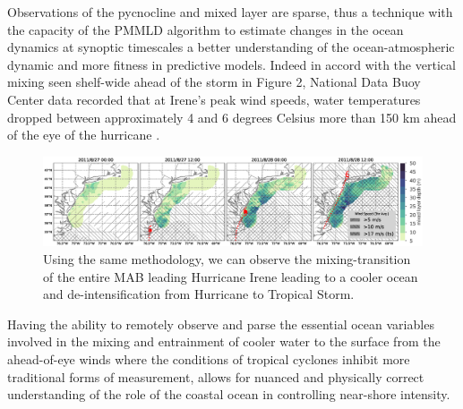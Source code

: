 \documentclass{article}
\begin{document}
Observations of the pycnocline and mixed layer are sparse, thus a technique with the capacity of the PMMLD algorithm to estimate changes in the ocean dynamics at synoptic timescales a better understanding of the ocean-atmospheric dynamic and more fitness in predictive models.
Indeed in accord with the vertical mixing seen shelf-wide ahead of the storm in Figure 2, National Data Buoy Center data recorded that at Irene’s peak wind speeds, water temperatures dropped between approximately 4 and 6 degrees Celsius more than 150 km ahead of the eye of the hurricane \cite{Seroka2016}.
\begin{figure}[h]
\caption{Using the same methodology, we can observe the mixing-transition of the entire MAB leading Hurricane Irene leading to a cooler ocean and de-intensification from Hurricane to Tropical Storm.}
\centering
\includegraphics[width=1.0\textwidth, keepaspectratio]{irene_4panel.eps}
\end{figure}
Having the ability to remotely observe and parse the essential ocean variables involved in the mixing and entrainment of cooler water to the surface from the ahead-of-eye winds where the conditions of tropical cyclones inhibit more traditional forms of measurement, allows for nuanced and physically correct understanding of the role of the coastal ocean in controlling near-shore intensity.
\end{document}
